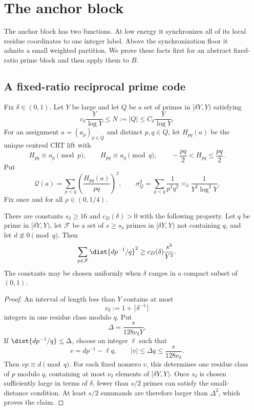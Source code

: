 \section{The anchor block}
\label{sec:anchor-block}

The anchor block has two functions.  At low energy it synchronizes all of its local residue coordinates to one integer label.  Above the synchronization floor it admits a small weighted partition.  We prove these facts first for an abstract fixed-ratio prime block and then apply them to $B$.

\subsection{A fixed-ratio reciprocal prime code}

Fix $\delta\in(0,1)$.  Let $Y$ be large and let $Q$ be a set of primes in $[\delta Y,Y)$ satisfying
\[
 c_\delta\frac{Y}{\log Y}\leq N:=|Q|\leq C_\delta\frac{Y}{\log Y}.
\]
For an assignment $a=(a_p)_{p\in Q}$ and distinct $p,q\in Q$, let $H_{pq}(a)$ be the unique centred CRT lift with
\[
 H_{pq}\equiv a_p\pmod p,
 \qquad
 H_{pq}\equiv a_q\pmod q,
 \qquad
 -\frac{pq}{2}<H_{pq}\leq\frac{pq}{2}.
\]
Put
\[
 \mathcal Q(a)=\sum_{p<q}\left(\frac{H_{pq}(a)}{pq}\right)^2,
 \qquad
 \sigma_Q^2=\sum_{p<q}\frac1{p^2q^2}\asymp_\delta\frac1{Y^2\log^2Y}.
\]
Fix once and for all $\rho\in(0,1/4)$.

\begin{lemma}
\label{lem:reciprocal-dispersion}
There are constants $s_\delta\geq16$ and $c_D(\delta)>0$ with the following property.  Let $q$ be prime in $[\delta Y,Y)$, let $\mathcal F$ be a set of $s\geq s_\delta$ primes in $[\delta Y,Y)$ not containing $q$, and let $d\not\equiv0\pmod q$.  Then
\[
 \sum_{p\in\mathcal F}\dist{d p^{-1}/q}^2
 \geq c_D(\delta)\frac{s^3}{Y^2}.
\]
The constants may be chosen uniformly when $\delta$ ranges in a compact subset of $(0,1)$.
\end{lemma}

\begin{proof}
An interval of length less than $Y$ contains at most
\[
 \nu_\delta:=1+\lceil\delta^{-1}\rceil
\]
integers in one residue class modulo $q$.  Put
\[
 \Delta=\frac{s}{128\nu_\delta Y}.
\]
If $\dist{dp^{-1}/q}\leq\Delta$, choose an integer $\ell$ such that
\[
 v=dp^{-1}-\ell q,
 \qquad
 |v|\leq\Delta q\leq\frac{s}{128\nu_\delta}.
\]
Then $vp\equiv d\pmod q$.  For each fixed nonzero $v$, this determines one residue class of $p$ modulo $q$, containing at most $\nu_\delta$ elements of $[\delta Y,Y)$.  Once $s_\delta$ is chosen sufficiently large in terms of $\delta$, fewer than $s/2$ primes can satisfy the small-distance condition.  At least $s/2$ summands are therefore larger than $\Delta^2$, which proves the claim.
\end{proof}

